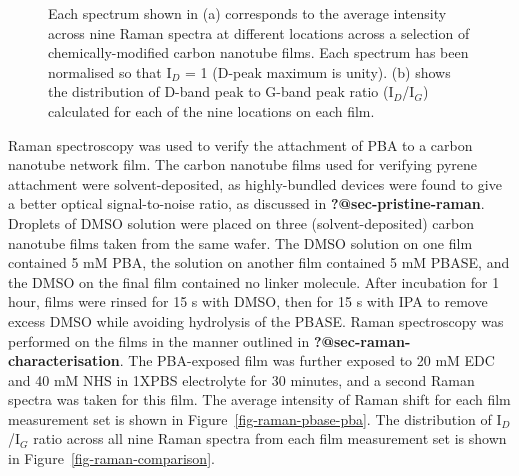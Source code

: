 \documentclass[
  a4paper,
]{scrbook}
\begin{document}
\begin{figure}
\begin{minipage}[t]{0.47\linewidth}
{{}

}

\subcaption{\label{fig-raman-comparison}}
\end{minipage}%

\caption{\label{fig-linker-raman}Each spectrum shown in (a) corresponds
to the average intensity across nine Raman spectra at different
locations across a selection of chemically-modified carbon nanotube
films. Each spectrum has been normalised so that I\(_D\) = 1 (D-peak
maximum is unity). (b) shows the distribution of D-band peak to G-band
peak ratio (I\(_D\)/I\(_G\)) calculated for each of the nine locations
on each film.}

\end{figure}

Raman spectroscopy was used to verify the attachment of PBA to a carbon
nanotube network film. The carbon nanotube films used for verifying
pyrene attachment were solvent-deposited, as highly-bundled devices were
found to give a better optical signal-to-noise ratio, as discussed in
\textbf{?@sec-pristine-raman}. Droplets of DMSO solution were placed on
three (solvent-deposited) carbon nanotube films taken from the same
wafer. The DMSO solution on one film contained 5 mM PBA, the solution on
another film contained 5 mM PBASE, and the DMSO on the final film
contained no linker molecule. After incubation for 1 hour, films were
rinsed for 15 s with DMSO, then for 15 s with IPA to remove excess DMSO
while avoiding hydrolysis of the PBASE. Raman spectroscopy was performed
on the films in the manner outlined in
\textbf{?@sec-raman-characterisation}. The PBA-exposed film was further
exposed to 20 mM EDC and 40 mM NHS in 1XPBS electrolyte for 30 minutes,
and a second Raman spectra was taken for this film. The average
intensity of Raman shift for each film measurement set is shown in
Figure~\ref{fig-raman-pbase-pba}. The distribution of I\(_D\)/I\(_G\)
ratio across all nine Raman spectra from each film measurement set is
shown in Figure~\ref{fig-raman-comparison}.
\end{document}

